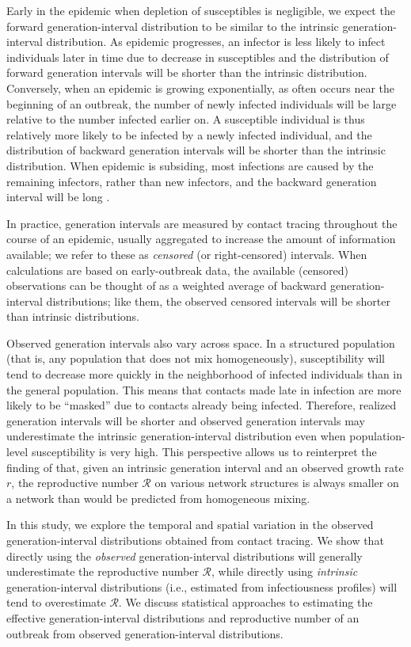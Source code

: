 \documentclass[12pt]{article}
\newcommand{\RR}{\ensuremath{{\mathcal R}}}
\begin{document}
Early in the epidemic when depletion of susceptibles is negligible, we expect the forward generation-interval distribution to be similar to the intrinsic generation-interval distribution.
As epidemic progresses, an infector is less likely to infect individuals later in time due to decrease in susceptibles and the distribution of forward generation intervals will be shorter than the intrinsic distribution.
Conversely, when an epidemic is growing exponentially, as often occurs near the beginning of an outbreak, the number of newly infected individuals will be large relative to the number infected earlier on. 
A susceptible individual is thus relatively more likely to be infected by a newly infected individual, and the distribution of backward generation intervals will be shorter than the intrinsic distribution.
When epidemic is subsiding, most infections are caused by the remaining infectors, rather than new infectors, and the backward generation interval will be long \citep{champredon2015intrinsic}.

In practice, generation intervals are measured by contact tracing throughout the course of an epidemic, usually aggregated to increase the amount of information available; we refer to these as \emph{censored} (or right-censored) intervals.
When calculations are based on early-outbreak data, the available (censored) observations can be thought of as a weighted average of backward generation-interval distributions; like them, the observed censored intervals will be shorter than intrinsic distributions.

Observed generation intervals also vary across space.
In a structured population (that is, any population that does not mix homogeneously), susceptibility will tend to decrease more quickly in the neighborhood of infected individuals than in the general population. 
This means that contacts made late in infection are more likely to be ``masked'' due to contacts already being infected.
Therefore, realized generation intervals will be shorter and observed generation intervals may underestimate the intrinsic generation-interval distribution even when population-level susceptibility is very high.
This perspective allows us to reinterpret the finding of \cite{trapman2016inferring} that, given an intrinsic generation interval and an observed growth rate $r$, the reproductive number $\RR$ on various network structures is always smaller on a network than would be predicted from homogeneous mixing.

In this study, we explore the temporal and spatial variation in the observed generation-interval distributions obtained from contact tracing.
We show that directly using the \emph{observed} generation-interval distributions will generally underestimate the reproductive number \RR, while directly using \emph{intrinsic} generation-interval distributions (i.e., estimated from infectiousness profiles) will tend to overestimate \RR.
We discuss statistical approaches to estimating the effective generation-interval distributions and reproductive number of an outbreak from observed generation-interval distributions.
\end{document}

